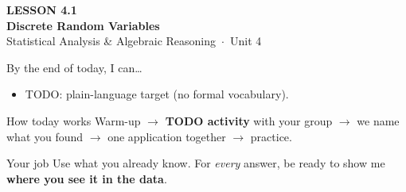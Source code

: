 \documentclass[aspectratio=169, 11pt]{beamer}
\begin{document}
{
\begin{frame}[plain]
  \vspace{2.8cm}\hspace{0.55cm}%
  \begin{minipage}{0.9\textwidth}
    {\color{goldacc}\bfseries\small LESSON 4.1}\\[0.5cm]
    {\color{white}\bfseries\LARGE Discrete Random Variables}\\[1.2cm]
    {\color{frostmid}\small Statistical Analysis \& Algebraic Reasoning~$\cdot$~Unit 4}
  \end{minipage}
\end{frame}
}

\newcommand{\redink}[1]{{\color{redacc}\bfseries #1}}

\begin{frame}[t, plain]
  By the end of today, I can\ldots
  \begin{itemize}\setlength{\itemsep}{6pt}
    \item TODO: plain-language target (no formal vocabulary).
  \end{itemize}
  \begin{block}{How today works}
    Warm-up $\to$ \textbf{TODO activity} with your group $\to$ we name what you found $\to$
    one application together $\to$ practice.
  \end{block}
\end{frame}

\begin{frame}[t, plain]
\end{frame}

\begin{frame}[t, plain]
  \begin{block}{Your job}
    Use what you already know. For \emph{every} answer, be ready to show me
    \textbf{where you see it in the data}.
  \end{block}
\end{frame}
\end{document}

